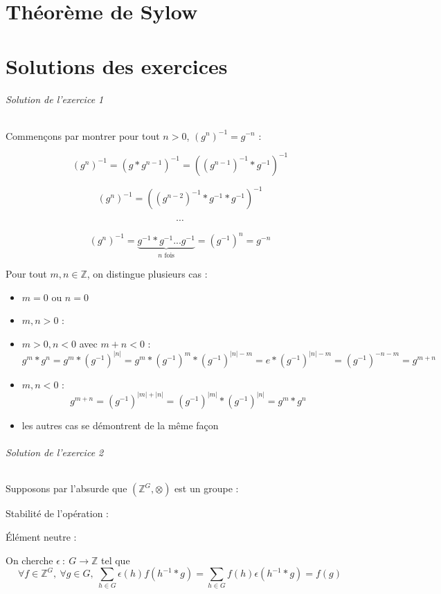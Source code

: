 \documentclass[]{article}
\theoremstyle{remark}
\theoremstyle{definition}
\newcommand{\funcshort}[3]{
#1 ~ : ~ #2 \longrightarrow #3
}
\begin{document}
\part{Théorème de Sylow}

\part{Solutions des exercices}

\paragraph{Solution de l'exercice 1}

Commençons par montrer pour tout $n > 0$, $( g^n )^{-1} = g^{-n}$ :

$$\left( g^n \right)^{-1} = (g * g^{n-1})^{-1} = ((g^{n-1})^{-1}*g^{-1})^{-1}$$

$$\left( g^n \right)^{-1} = ((g^{n-2})^{-1}*g^{-1}*g^{-1})^{-1}$$

$$\cdots$$

$$\left( g^n \right)^{-1} = \underbrace{g^{-1}*g^{-1} ... g^{-1}}_{n \text{ fois}} = (g^{-1})^n = g^{-n}$$

Pour tout $m, n \in \mathbb{Z}$, on distingue plusieurs cas :
\begin{itemize}
	\item $m = 0$ ou $n = 0$ \checkmark
	\item $m, n > 0$ : \checkmark
	\item $m > 0, n < 0$ avec $m + n < 0$ : $$g^m * g^n = g^m * \left(g^{-1}\right)^{|n|} = g^m*\left(g^{-1}\right)^m*\left(g^{-1}\right)^{|n| - m} = e * \left(g^{-1}\right)^{|n|-m}=\left(g^{-1}\right)^{-n-m}=g^{m+n}$$
	\item $m, n < 0$ : $$g^{m+n}=\left(g^{-1}\right)^{|m|+|n|}=\left(g^{-1}\right)^{|m|}*\left(g^{-1}\right)^{|n|}=g^m*g^n$$
	\item les autres cas se démontrent de la même façon
\end{itemize}

\paragraph{Solution de l'exercice 2}

Supposons par l'absurde que $\left(\mathbb{Z}^G, \otimes\right)$ est un groupe :

\subparagraph{Stabilité de l'opération :} \checkmark

\subparagraph{Élément neutre :} On cherche $\funcshort{\epsilon}{G}{\mathbb{Z}}$ tel que
$$\forall f \in \mathbb{Z}^G, ~ \forall g \in G, ~ \sum_{h \in G}\epsilon(h)f(h^{-1}*g)=\sum_{h \in G}f(h)\epsilon(h^{-1}*g)=f(g)$$
\end{document}
